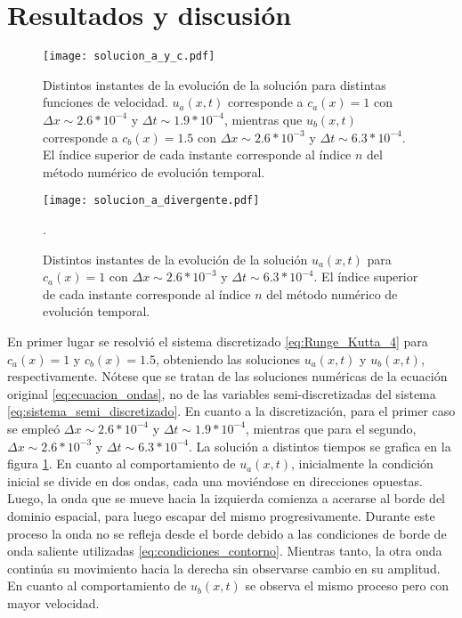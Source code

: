 \documentclass[aps,prb,twocolumn,superscriptaddress,floatfix,longbibliography,10pt]{revtex4-2}
\newcounter{para}
\begin{document}
\section{Resultados y discusión}


\begin{figure}[h]
  \texttt{[image: solucion\_a\_y\_c.pdf]}
  \caption{Distintos instantes de la evolución de la solución para distintas funciones de velocidad. $u_a(x,t)$ corresponde a $c_a(x) = 1$ con $\Delta x \sim 2.6*10^{-4}$ y $\Delta t \sim 1.9*10^{-4}$, mientras que $u_b(x,t)$ corresponde a $c_b(x) = 1.5$ con $\Delta x \sim 2.6*10^{-3}$ y $\Delta t \sim 6.3*10^{-4}$. El índice superior de cada instante corresponde al índice $n$ del método numérico de evolución temporal.}
   \label{fig:solucion_a_y_c}
\end{figure}

\begin{figure}[h]
  \texttt{[image: solucion\_a\_divergente.pdf]}
  \caption{Distintos instantes de la evolución de la solución $u_a(x,t)$ para $c_a(x) = 1$ con $\Delta x \sim 2.6*10^{-3}$ y $\Delta t \sim 6.3*10^{-4}$. El índice superior de cada instante corresponde al índice $n$ del método numérico de evolución temporal.}.
   \label{fig:solucion_a_divergente}
\end{figure}

En primer lugar se resolvió el sistema discretizado \ref{eq:Runge_Kutta_4} para $c_a(x) = 1$ y $c_b(x) = 1.5$, obteniendo las soluciones $u_a(x,t)$ y $u_b(x,t)$, respectivamente. Nótese que se tratan de las soluciones numéricas de la ecuación original \ref{eq:ecuacion_ondas}, no de las variables semi-discretizadas del sistema \ref{eq:sistema_semi_discretizado}. En cuanto a la discretización, para el primer caso se empleó $\Delta x \sim 2.6*10^{-4}$ y $\Delta t \sim 1.9*10^{-4}$, mientras que para el segundo, $\Delta x \sim 2.6*10^{-3}$ y $\Delta t \sim 6.3*10^{-4}$. La solución a distintos tiempos se grafica en la figura \ref{fig:solucion_a_y_c}. En cuanto al comportamiento de $u_a(x,t)$, inicialmente la condición inicial se divide en dos ondas, cada una moviéndose en direcciones opuestas. Luego, la onda que se mueve hacia la izquierda comienza a acerarse al borde del dominio espacial, para luego escapar del mismo progresivamente. Durante este proceso la onda no se refleja desde el borde debido a las condiciones de borde de onda saliente utilizadas \ref{eq:condiciones_contorno}. Mientras tanto, la otra onda continúa su movimiento hacia la derecha sin observarse cambio en su amplitud. En cuanto al comportamiento de $u_b(x,t)$ se observa el mismo proceso pero con mayor velocidad.
\end{document}
